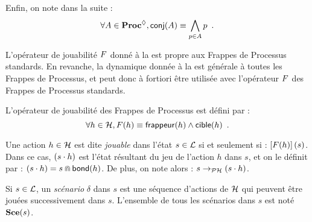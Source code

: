 Enfin, on note dans la suite :
\[\forall A \in \mathbf{Proc}^{\lozenge}, \mathsf{conj}(A) \equiv \bigwedge_{p \in A} p \enspace.\]

L'opérateur de jouabilité $F$ donné à la  est propre aux
Frappes de Processus standards.
En revanche, la dynamique donnée à la  est générale à toutes les
Frappes de Processus, et peut donc à fortiori être utilisée avec l'opérateur $F$
des Frappes de Processus standards.

\begin{definition}
  L'opérateur de jouabilité des Frappes de Processus est défini par :
  \[\forall h \in \mathcal{H}, F(h) \equiv \mathsf{frappeur}(h) \wedge \mathsf{cible}(h) \enspace.\]
\end{definition}

\begin{definition}
  Une action $h \in \mathcal{H}$ est dite \emph{jouable}
  dans l'état $s \in \mathcal{L}$ si et seulement si :
  $\left[F(h)\right](s)$.
  Dans ce cas, $(s \cdot h)$ est l'état résultant du jeu de l'action $h$ dans $s$,
  et on le définit par : $(s \cdot h) = s \Cap \mathsf{bond}(h)$.
  De plus, on note alors : $s \rightarrow_{\mathcal{PH}} (s \cdot h)$.

  Si $s \in \mathcal{L}$, un \emph{scénario} $\delta$ dans $s$
  est une séquence d'actions de $\mathcal{H}$ qui peuvent être jouées successivement dans $s$.
  L'ensemble de tous les scénarios dans $s$ est noté $\mathbf{Sce}(s)$.
\end{definition}

